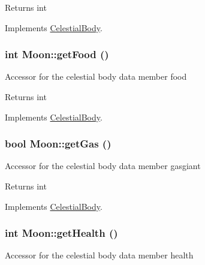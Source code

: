 \begin{DoxyReturn}{Returns}
int 
\end{DoxyReturn}


Implements \hyperlink{classCelestialBody}{CelestialBody}.

\hypertarget{classMoon_a790c4ae16bde7df44f608c98a535afec}{
\subsubsection[{getFood}]{\setlength{\rightskip}{0pt plus 5cm}int Moon::getFood ()}}
\label{d8/d6f/classMoon_a790c4ae16bde7df44f608c98a535afec}
Accessor for the celestial body data member food

\begin{DoxyReturn}{Returns}
int 
\end{DoxyReturn}


Implements \hyperlink{classCelestialBody}{CelestialBody}.

\hypertarget{classMoon_ad7881084092664bd2bd72a12552fb4a0}{
\subsubsection[{getGas}]{\setlength{\rightskip}{0pt plus 5cm}bool Moon::getGas ()}}
\label{d8/d6f/classMoon_ad7881084092664bd2bd72a12552fb4a0}
Accessor for the celestial body data member gasgiant

\begin{DoxyReturn}{Returns}
int 
\end{DoxyReturn}


Implements \hyperlink{classCelestialBody}{CelestialBody}.

\hypertarget{classMoon_a70626fe26dfa798f21791cc182a829f4}{
\subsubsection[{getHealth}]{\setlength{\rightskip}{0pt plus 5cm}int Moon::getHealth ()}}
\label{d8/d6f/classMoon_a70626fe26dfa798f21791cc182a829f4}
Accessor for the celestial body data member health


